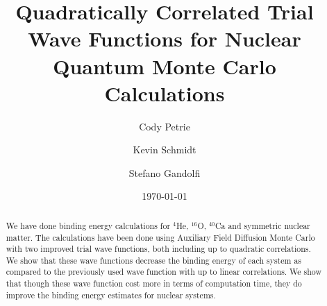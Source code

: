 \documentclass[aps,prl,reprint,superscriptaddress]{revtex4-1}
\begin{document}

\title{Quadratically Correlated Trial Wave Functions for Nuclear Quantum Monte Carlo Calculations}


\author{Cody Petrie}
\author{Kevin Schmidt}
\author{Stefano Gandolfi}


\date{\today}

\begin{abstract}
We have done binding energy calculations for $^4$He, $^{16}$O, $^{40}$Ca and symmetric nuclear matter. The calculations have been done using Auxiliary Field Diffusion Monte Carlo with two improved trial wave functions, both including up to quadratic correlations. We show that these wave functions decrease the binding energy of each system as compared to the previously used wave function with up to linear correlations. We show that though these wave function cost more in terms of computation time, they do improve the binding energy estimates for nuclear systems.
\end{abstract}

\pacs{}
\end{document}
